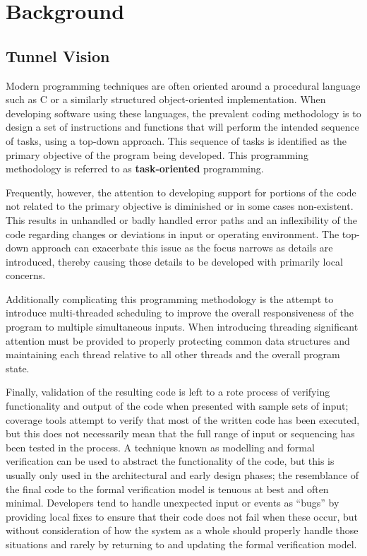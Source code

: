 \tableofcontents


\section{Background}

\subsection{Tunnel Vision}

Modern programming techniques are often oriented around a procedural
language such as C or a similarly structured object-oriented
implementation.  When developing software using these languages, the
prevalent coding methodology is to design a set of instructions and
functions that will perform the intended sequence of tasks, using a
top-down approach.  This sequence of tasks is identified as the
primary objective of the program being developed.  This programming
methodology is referred to as {\bf task-oriented} programming.

Frequently, however, the attention to developing support for portions
of the code not related to the primary objective is diminished or in
some cases non-existent.  This results in unhandled or badly handled
error paths and an inflexibility of the code regarding changes or
deviations in input or operating environment.  The top-down approach
can exacerbate this issue as the focus narrows as details are
introduced, thereby causing those details to be developed with
primarily local concerns.

Additionally complicating this programming methodology is the attempt
to introduce multi-threaded scheduling to improve the overall
responsiveness of the program to multiple simultaneous inputs.  When
introducing threading significant attention must be provided to
properly protecting common data structures and maintaining each thread
relative to all other threads and the overall program state.

Finally, validation of the resulting code is left to a rote process of
verifying functionality and output of the code when presented with
sample sets of input; coverage tools attempt to verify that most of
the written code has been executed, but this does not necessarily mean
that the full range of input or sequencing has been tested in the
process.  A technique known as modelling and formal verification can
be used to abstract the functionality of the code, but this is usually
only used in the architectural and early design phases; the
resemblance of the final code to the formal verification model is
tenuous at best and often minimal.  Developers tend to handle
unexpected input or events as ``bugs'' by providing local fixes to
ensure that their code does not fail when these occur, but without
consideration of how the system as a whole should properly handle
those situations and rarely by returning to and updating the formal
verification model.

